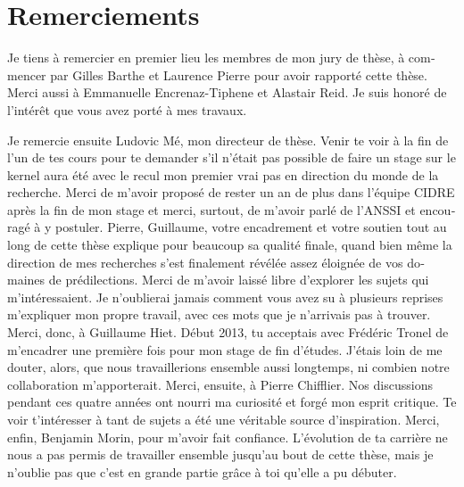 \chapter*{Remerciements}

\begin{otherlanguage}{french}
  Je tiens à remercier en premier lieu les membres de mon jury de thèse, à
  commencer par Gilles Barthe et Laurence Pierre pour avoir rapporté cette
  thèse. Merci aussi à Emmanuelle Encrenaz-Tiphene et Alastair Reid. Je suis
  honoré de l’intérêt que vous avez porté à mes travaux.

  Je remercie ensuite Ludovic Mé, mon directeur de thèse. Venir te voir à la fin
  de l’un de tes cours pour te demander s’il n’était pas possible de faire un
  stage \og{}sur le kernel\fg{} aura été avec le recul mon premier vrai pas en
  direction du monde de la recherche. Merci de m’avoir proposé de rester un an
  de plus dans l’équipe CIDRE après la fin de mon stage et merci, surtout, de
  m’avoir parlé de l’ANSSI et encouragé à y postuler.
  Pierre, Guillaume, votre encadrement et votre soutien tout au long de cette
  thèse explique pour beaucoup sa qualité finale, quand bien même la direction
  de mes recherches s’est finalement révélée assez éloignée de vos domaines de
  prédilections. Merci de m’avoir laissé libre d’explorer les sujets qui
  m’intéressaient. Je n’oublierai jamais comment vous avez su à plusieurs
  reprises m’expliquer mon propre travail, avec ces mots que je n'arrivais pas à
  trouver.
  Merci, donc, à Guillaume Hiet. Début 2013, tu acceptais avec Frédéric Tronel
  de m’encadrer une première fois pour mon stage de fin d’études. J’étais loin
  de me douter, alors, que nous travaillerions ensemble aussi longtemps, ni
  combien notre collaboration m’apporterait.
  Merci, ensuite, à Pierre Chifflier. Nos discussions pendant ces quatre années
  ont nourri ma curiosité et forgé mon esprit critique. Te voir t’intéresser à
  tant de sujets a été une véritable source d’inspiration.
  Merci, enfin, Benjamin Morin, pour m'avoir fait confiance. L’évolution de ta
  carrière ne nous a pas permis de travailler ensemble jusqu’au bout de cette
  thèse, mais je n’oublie pas que c’est en grande partie grâce à toi qu’elle a
  pu débuter.


\end{otherlanguage}
